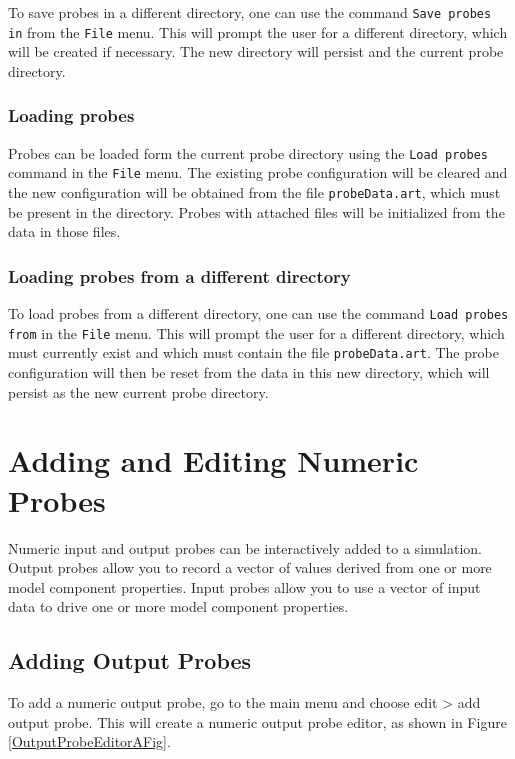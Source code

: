 \documentclass{article}
\begin{document}
To save probes in a different directory, one can use the command 
{\tt Save probes in} from the {\tt File} menu. This will prompt the user
for a different directory, which will be created if necessary.
The new directory will persist and the current probe directory.

\subsubsection{Loading probes}

Probes can be loaded form the current probe directory using the 
{\tt Load probes} command in the {\tt File} menu. The existing probe
configuration will be cleared and the new configuration will be
obtained from the file {\tt probeData.art}, which must be present in
the directory. Probes with attached files will be initialized from the
data in those files.

\subsubsection{Loading probes from a different directory}

To load probes from a different directory, one can use the command 
{\tt Load probes from} in the {\tt File} menu. This will prompt the user
for a different directory, which must currently exist and
which must contain the file {\tt probeData.art}. The probe
configuration will then be reset from the data in this new
directory, which will persist as the new current probe directory.

\section{Adding and Editing Numeric Probes}
\label{AddingAndEditingNumericProbesSec}

Numeric input and output probes can be interactively added to a
simulation. Output probes allow you to record a vector of values
derived from one or more model component properties.  Input probes
allow you to use a vector of input data to drive one or more model
component properties.

\subsection{Adding Output Probes}

To add a numeric output probe, go to the main
menu and choose {\sf edit > add output probe}. This will create
a numeric output probe editor, as shown in Figure \ref{OutputProbeEditorAFig}.
\end{document}
